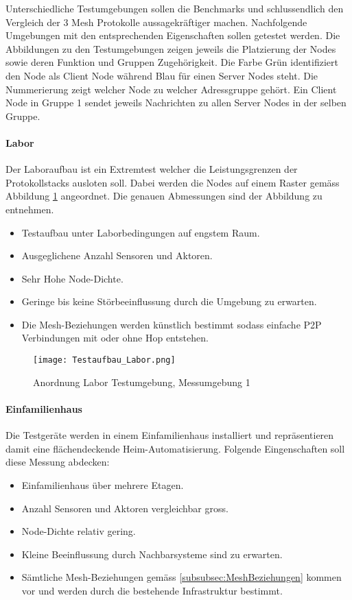Unterschiedliche Testumgebungen sollen die Benchmarks und schlussendlich den Vergleich der 3 Mesh Protokolle aussagekräftiger machen.
Nachfolgende Umgebungen mit den entsprechenden Eigenschaften sollen getestet werden.
Die Abbildungen zu den Testumgebungen zeigen jeweils die Platzierung der Nodes sowie deren Funktion und Gruppen Zugehörigkeit. Die Farbe Grün identifiziert den Node als Client Node während Blau für einen Server Nodes steht. Die Nummerierung zeigt welcher Node zu welcher Adressgruppe gehört. Ein Client Node in Gruppe 1 sendet jeweils Nachrichten zu allen Server Nodes in der selben Gruppe.

\paragraph{Labor}
Der Laboraufbau ist ein Extremtest welcher die Leistungsgrenzen der Protokollstacks ausloten soll. Dabei werden die Nodes auf einem Raster gemäss Abbildung \ref{fig:AnordnungLaborTestumgebungMessumgebung1} angeordnet. Die genauen Abmessungen sind der Abbildung zu entnehmen.
\begin{itemize}
	\item Testaufbau unter Laborbedingungen auf engstem Raum.
	\item Ausgeglichene Anzahl Sensoren und Aktoren.
	\item Sehr Hohe Node-Dichte.
	\item Geringe bis keine Störbeeinflussung durch die Umgebung zu  erwarten.
	\item Die Mesh-Beziehungen werden künstlich bestimmt sodass einfache P2P Verbindungen mit oder ohne Hop entstehen.
\end{itemize}


\begin{figure}[H]
\centering
\texttt{[image: Testaufbau\_Labor.png]}
\caption{Anordnung Labor Testumgebung, Messumgebung 1}\label{fig:AnordnungLaborTestumgebungMessumgebung1}
\end{figure}
	


\paragraph{Einfamilienhaus}
Die Testgeräte werden in einem Einfamilienhaus installiert und repräsentieren damit eine flächendeckende Heim-Automatisierung. Folgende Eingenschaften soll diese Messung abdecken:
\begin{itemize}
	\item Einfamilienhaus über mehrere Etagen.
	\item Anzahl Sensoren und Aktoren vergleichbar gross.
	\item Node-Dichte relativ gering.
	\item Kleine Beeinflussung durch Nachbarsysteme sind zu erwarten.
	\item Sämtliche Mesh-Beziehungen gemäss \ref{subsubsec:MeshBeziehungen} kommen vor und werden durch die bestehende Infrastruktur bestimmt.
\end{itemize}

